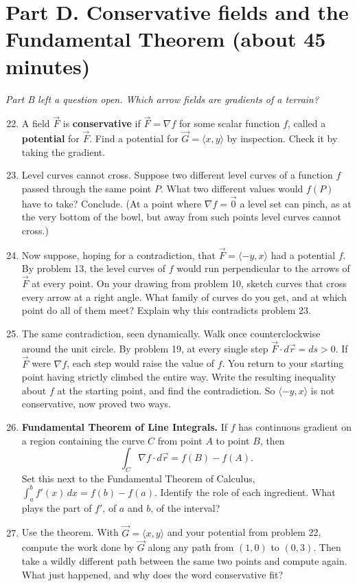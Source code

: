 \documentclass[12pt]{article}
\newcommand{\flow}[1]{\par\noindent\textit{#1}\par\vspace{1mm}}
\begin{document}
\newpage
\section*{Part D. Conservative fields and the Fundamental Theorem (about 45 minutes)}

\flow{Part B left a question open. Which arrow fields are gradients of a terrain?}

\begin{enumerate}\setcounter{enumi}{21}
  \item A field $\vec F$ is \textbf{conservative} if $\vec F = \nabla f$ for some scalar function $f$, called a \textbf{potential} for $\vec F$. Find a potential for $\vec G = \langle x, y \rangle$ by inspection. Check it by taking the gradient.
  \item Level curves cannot cross. Suppose two different level curves of a function $f$ passed through the same point $P$. What two different values would $f(P)$ have to take? Conclude. (At a point where $\nabla f = \vec 0$ a level set can pinch, as at the very bottom of the bowl, but away from such points level curves cannot cross.)
  \item Now suppose, hoping for a contradiction, that $\vec F = \langle -y, x \rangle$ had a potential $f$. By problem 13, the level curves of $f$ would run perpendicular to the arrows of $\vec F$ at every point. On your drawing from problem 10, sketch curves that cross every arrow at a right angle. What family of curves do you get, and at which point do all of them meet? Explain why this contradicts problem 23.
  \item The same contradiction, seen dynamically. Walk once counterclockwise around the unit circle. By problem 19, at every single step $\vec F \cdot d\vec r = ds > 0$. If $\vec F$ were $\nabla f$, each step would raise the value of $f$. You return to your starting point having strictly climbed the entire way. Write the resulting inequality about $f$ at the starting point, and find the contradiction. So $\langle -y, x \rangle$ is not conservative, now proved two ways.
  \item \textbf{Fundamental Theorem of Line Integrals.} If $f$ has continuous gradient on a region containing the curve $C$ from point $A$ to point $B$, then
  $$\int_C \nabla f \cdot d\vec r = f(B) - f(A).$$
  Set this next to the Fundamental Theorem of Calculus, $\int_a^b f'(x)\,dx = f(b) - f(a)$. Identify the role of each ingredient. What plays the part of $f'$, of $a$ and $b$, of the interval?
  \item Use the theorem. With $\vec G = \langle x, y \rangle$ and your potential from problem 22, compute the work done by $\vec G$ along any path from $(1,0)$ to $(0,3)$. Then take a wildly different path between the same two points and compute again. What just happened, and why does the word conservative fit?

\end{enumerate}
\end{document}
